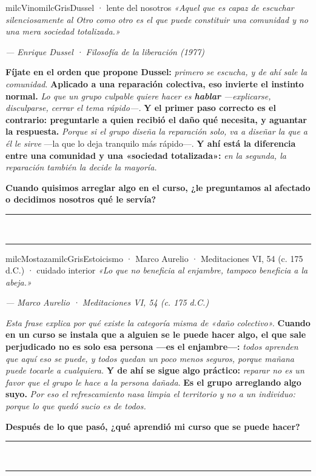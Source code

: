 \documentclass[11pt,letterpaper]{article}
\newcommand{\linead}[1]{\noindent\color{milcLinea}\rule{#1}{0.5pt}\color{milcNegro}}
\begin{document}
\begin{softbox}{milcVino}{milcGris}{Dussel · lente del nosotros}
\textit{«Aquel que es capaz de escuchar silenciosamente al Otro como otro es el que puede constituir una comunidad y no una mera sociedad totalizada.»}

{\footnotesize\itshape\color{milcNegro!70}--- Enrique Dussel · Filosofía de la liberación (1977)}

\textbf{Fíjate en el orden que propone Dussel:} \emph{primero se escucha, y de ahí sale la comunidad}. \textbf{Aplicado a una reparación colectiva, eso invierte el instinto normal.} \emph{Lo que un grupo culpable quiere hacer es \textbf{hablar} ---explicarse, disculparse, cerrar el tema rápido---.} \textbf{Y el primer paso correcto es el contrario: preguntarle a quien recibió el daño qué necesita, y aguantar la respuesta.} \emph{Porque si el grupo diseña la reparación solo, va a diseñar la que a él le sirve} ---la que lo deja tranquilo más rápido---. \textbf{Y ahí está la diferencia entre una comunidad y una «sociedad totalizada»:} \emph{en la segunda, la reparación también la decide la mayoría.}

\textbf{Cuando quisimos arreglar algo en el curso, ¿le preguntamos al afectado o decidimos nosotros qué le servía?}
\end{softbox}
\linead{\linewidth}\\[1mm]
\linead{\linewidth}

\begin{softbox}{milcMostaza}{milcGris}{Estoicismo · Marco Aurelio · Meditaciones VI, 54 (c. 175 d.C.) · cuidado interior}
\textit{«Lo que no beneficia al enjambre, tampoco beneficia a la abeja.»}

{\footnotesize\itshape\color{milcNegro!70}--- Marco Aurelio · Meditaciones VI, 54 (c. 175 d.C.)}

\emph{Esta frase explica por qué existe la categoría misma de «daño colectivo».} \textbf{Cuando en un curso se instala que a alguien se le puede hacer algo, el que sale perjudicado no es solo esa persona ---es el enjambre---:} \emph{todos aprenden que aquí eso se puede, y todos quedan un poco menos seguros, porque mañana puede tocarle a cualquiera.} \textbf{Y de ahí se sigue algo práctico:} \emph{reparar no es un favor que el grupo le hace a la persona dañada}. \textbf{Es el grupo arreglando algo suyo.} \emph{Por eso el refrescamiento nasa limpia el territorio y no a un individuo: porque lo que quedó sucio es de todos.}

\textbf{Después de lo que pasó, ¿qué aprendió mi curso que se puede hacer?}
\end{softbox}
\linead{\linewidth}\\[1mm]
\linead{\linewidth}
\end{document}

